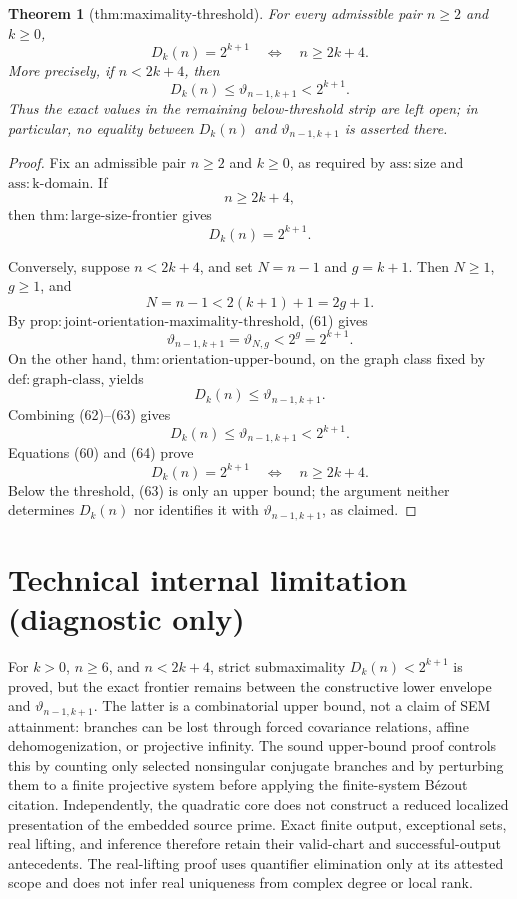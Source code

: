 \documentclass{article}
\newtheorem{theorem}{Theorem}
\begin{document}
\begin{theorem}[thm:maximality-threshold]\label{thm:maximality-threshold}
For every admissible pair \(n\geq2\) and \(k\geq0\),
\[
 D_k(n)=2^{k+1}
 \quad\Longleftrightarrow\quad
 n\geq2k+4.
\]
More precisely, if \(n<2k+4\), then
\[
 D_k(n)\leq\vartheta_{n-1,k+1}<2^{k+1}.
\]
Thus the exact values in the remaining below-threshold strip are left open; in particular, no equality between \(D_k(n)\) and \(\vartheta_{n-1,k+1}\) is asserted there.
\end{theorem}
\begin{proof}
Fix an admissible pair \(n\geq2\) and \(k\geq0\), as required by \(\mathrm{ass:size}\) and \(\mathrm{ass:k\mbox{-}domain}\).  If
\[
 n\geq2k+4,
\tag{59}
\]
then \(\mathrm{thm:large\mbox{-}size\mbox{-}frontier}\) gives
\[
 D_k(n)=2^{k+1}.
\tag{60}
\]

Conversely, suppose \(n<2k+4\), and set \(N=n-1\) and \(g=k+1\).  Then \(N\geq1\), \(g\geq1\), and
\[
 N=n-1<2(k+1)+1=2g+1.
\tag{61}
\]
By \(\mathrm{prop:joint\mbox{-}orientation\mbox{-}maximality\mbox{-}threshold}\), (61) gives
\[
 \vartheta_{n-1,k+1}=\vartheta_{N,g}<2^g=2^{k+1}.
\tag{62}
\]
On the other hand, \(\mathrm{thm:orientation\mbox{-}upper\mbox{-}bound}\), on the graph class fixed by \(\mathrm{def:graph\mbox{-}class}\), yields
\[
 D_k(n)\leq\vartheta_{n-1,k+1}.
\tag{63}
\]
Combining (62)--(63) gives
\[
 D_k(n)\leq\vartheta_{n-1,k+1}<2^{k+1}.
\tag{64}
\]
Equations (60) and (64) prove
\[
 D_k(n)=2^{k+1}\quad\Longleftrightarrow\quad n\geq2k+4.
\tag{65}
\]
Below the threshold, (63) is only an upper bound; the argument neither determines \(D_k(n)\) nor identifies it with \(\vartheta_{n-1,k+1}\), as claimed.
\end{proof}

\section*{Technical internal limitation (diagnostic only)}

For \(k>0\), \(n\geq6\), and \(n<2k+4\), strict submaximality \(D_k(n)<2^{k+1}\) is proved, but the exact frontier remains between the constructive lower envelope and \(\vartheta_{n-1,k+1}\). The latter is a combinatorial upper bound, not a claim of SEM attainment: branches can be lost through forced covariance relations, affine dehomogenization, or projective infinity. The sound upper-bound proof controls this by counting only selected nonsingular conjugate branches and by perturbing them to a finite projective system before applying the finite-system B\'ezout citation. Independently, the quadratic core does not construct a reduced localized presentation of the embedded source prime. Exact finite output, exceptional sets, real lifting, and inference therefore retain their valid-chart and successful-output antecedents. The real-lifting proof uses quantifier elimination only at its attested scope and does not infer real uniqueness from complex degree or local rank.
\end{document}

